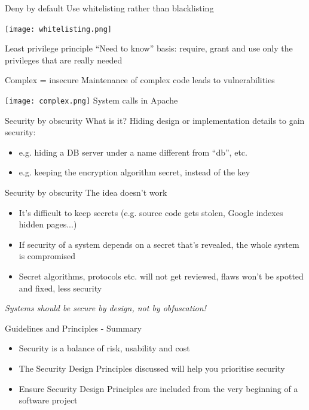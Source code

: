 \documentclass[aspectratio=169]{beamer}
\begin{document}
\begin{frame}{{\color{red}Deny by default}}
Use whitelisting rather than blacklisting
\begin{center}
\texttt{[image: whitelisting.png]}
\end{center}
\end{frame}

\begin{frame}{Least privilege principle}
“Need to know” basis: require, grant and use only the privileges that are really needed
\end{frame}

\begin{frame}{Complex = insecure}
Maintenance of complex code leads to vulnerabilities
\begin{center}
\texttt{[image: complex.png]} \newline
System calls in Apache
\end{center}
\end{frame}

\begin{frame}{Security by obscurity}
What is it? Hiding design or implementation details to gain security:
\begin{itemize}
\item e.g. hiding a DB server under a name different from “db”, etc.
\item e.g. keeping the encryption algorithm secret, instead of the key
\end{itemize}
\end{frame}

\begin{frame}{Security by obscurity}
The idea doesn’t work
\begin{itemize}
\item It’s difficult to keep secrets (e.g. source code gets stolen, Google indexes hidden pages...)
\item If security of a system depends on a secret that's revealed, the whole system is compromised
\item Secret algorithms, protocols etc. will not get reviewed, flaws won’t be spotted and fixed, less security
\end{itemize}
\centering
{ \color{red} \textit{Systems should be secure by design, not by obfuscation!} }
\end{frame}

\begin{frame}{Guidelines and Principles - Summary}
\begin{itemize}
\item Security is a balance of risk, usability and cost
\item The Security Design Principles discussed will help you prioritise security
\item Ensure Security Design Principles are included from the very beginning of a software project
\end{itemize}
\end{frame}
\end{document}
